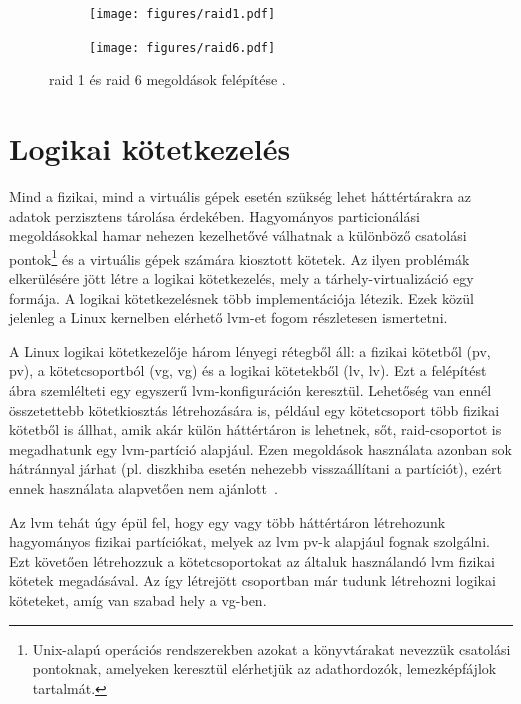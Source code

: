 \begin{figure}[!ht]
	\centering
	\begin{subfigure}{0.3\textwidth}
		\centering
		\texttt{[image: figures/raid1.pdf]}
	\end{subfigure}
	\hspace{0.05\textwidth}
	\begin{subfigure}{0.6\textwidth}
		\centering
		\texttt{[image: figures/raid6.pdf]}
	\end{subfigure}
	\caption{\acrshort{raid} 1 és \acrshort{raid} 6 megoldások felépítése \cite{WikiRaidLevels}.}
	\label{fig:raid}
\end{figure}


\section{Logikai kötetkezelés}
\label{sect:lvm}
Mind a fizikai, mind a virtuális gépek esetén szükség lehet háttértárakra az adatok perzisztens tárolása érdekében. Hagyományos particionálási megoldásokkal hamar nehezen kezelhetővé válhatnak a különböző csatolási pontok\footnote{Unix-alapú operációs rendszerekben azokat a könyvtárakat nevezzük csatolási pontoknak, amelyeken keresztül elérhetjük az adathordozók, lemezképfájlok tartalmát.} és a virtuális gépek számára kiosztott kötetek. Az ilyen problémák elkerülésére jött létre a logikai kötetkezelés, mely a tárhely-virtualizáció egy formája. A logikai kötetkezelésnek több implementációja létezik. %
Ezek közül jelenleg a Linux kernelben elérhető \gls{lvm}-et fogom részletesen ismertetni.

A Linux logikai kötetkezelője három lényegi rétegből áll: a fizikai kötetből (\acrlong{pv}, \acrshort{pv}), a kötetcsoportból (\acrlong{vg}, \acrshort{vg}) és a logikai kötetekből (\acrlong{lv}, \acrshort{lv}). Ezt a felépítést  ábra szemlélteti egy egyszerű \gls{lvm}-konfiguráción keresztül.
Lehetőség van ennél összetettebb kötetkiosztás létrehozására is, például egy kötetcsoport több fizikai kötetből is állhat, amik akár külön háttértáron is lehetnek, sőt, \acrshort{raid}-csoportot is megadhatunk egy \gls{lvm}-partíció alapjául. Ezen megoldások használata azonban sok hátránnyal járhat (pl. diszkhiba esetén nehezebb visszaállítani a partíciót), ezért ennek használata alapvetően nem ajánlott~\cite{RHLVM}.

Az \gls{lvm} tehát úgy épül fel, hogy egy vagy több háttértáron létrehozunk hagyományos fizikai partíciókat, melyek az \gls{lvm} \acrshort{pv}-k alapjául fognak szolgálni. Ezt követően létrehozzuk a kötetcsoportokat az általuk használandó \acrshort{lvm} fizikai kötetek megadásával. Az így létrejött csoportban már tudunk létrehozni logikai köteteket, amíg van szabad hely a \acrshort{vg}-ben.

